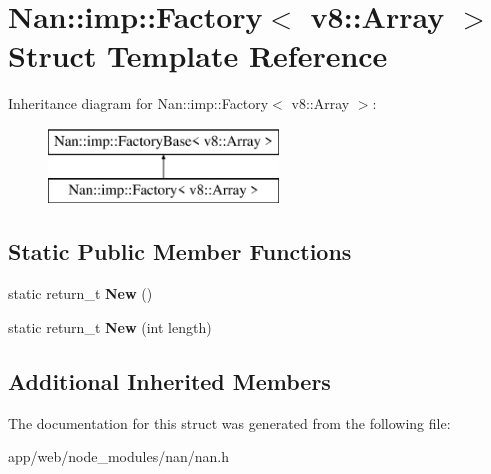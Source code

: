 \hypertarget{struct_nan_1_1imp_1_1_factory_3_01v8_1_1_array_01_4}{}\section{Nan\+:\+:imp\+:\+:Factory$<$ v8\+:\+:Array $>$ Struct Template Reference}
\label{struct_nan_1_1imp_1_1_factory_3_01v8_1_1_array_01_4}
Inheritance diagram for Nan\+:\+:imp\+:\+:Factory$<$ v8\+:\+:Array $>$\+:\begin{figure}[H]
\begin{center}
\leavevmode
\includegraphics[height=2.000000cm]{struct_nan_1_1imp_1_1_factory_3_01v8_1_1_array_01_4}
\end{center}
\end{figure}
\subsection*{Static Public Member Functions}
\begin{DoxyCompactItemize}
\item 
\mbox{\label{struct_nan_1_1imp_1_1_factory_3_01v8_1_1_array_01_4_a1da787720f856a44da7acbc011c0af2c}} 
static return\+\_\+t {\bfseries New} ()
\item 
\mbox{\label{struct_nan_1_1imp_1_1_factory_3_01v8_1_1_array_01_4_aeeda03968f2b6533ae4de525ad87bec7}} 
static return\+\_\+t {\bfseries New} (int length)
\end{DoxyCompactItemize}
\subsection*{Additional Inherited Members}


The documentation for this struct was generated from the following file\+:\begin{DoxyCompactItemize}
\item 
app/web/node\+\_\+modules/nan/nan.\+h\end{DoxyCompactItemize}
